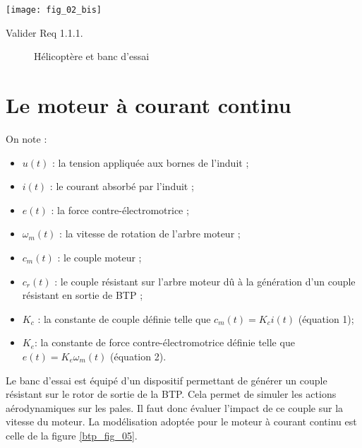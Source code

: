 \fi


\begin{marginfigure}
\centering
\texttt{[image: fig\_02\_bis]}
\end{marginfigure}

\begin{obj}
	Valider Req 1.1.1.
\end{obj}

\ifprof
\else


\begin{figure}[!h]%
    \centering
    \caption{Hélicoptère et banc d'essai}%
    \label{fig:04}%
\end{figure}
\fi

\section*{Le moteur à courant continu}
\ifprof
\else

On note :
\begin{itemize}
	\item $u(t)$ : la tension appliquée aux bornes de l'induit ;
	\item $i(t)$ : le courant absorbé par l'induit ;
	\item $e(t)$ : la force contre-électromotrice ;
	\item $\omega_m (t)$ : la vitesse de rotation de l'arbre moteur ;
	\item $c_m (t)$ : le couple moteur ;
	\item $c_r (t)$ : le couple résistant sur l'arbre moteur dû à la génération d'un couple résistant en sortie de BTP ;
	\item $K_c$ : la constante de couple définie telle que
 $c_m (t)=K_c i(t)$	(équation 1);
	\item $K_e$: la constante de force contre-électromotrice définie telle que $e(t)=K_e \omega_m (t)$	(équation 2).
	\end{itemize}


Le banc d'essai est équipé d'un dispositif permettant de générer un couple résistant sur le rotor de sortie de la BTP. Cela permet de simuler les actions aérodynamiques sur les pales. Il faut donc évaluer l'impact de ce couple sur la vitesse du moteur. 
La modélisation adoptée pour le moteur à courant continu est celle de la figure \ref{btp_fig_05}.
 
